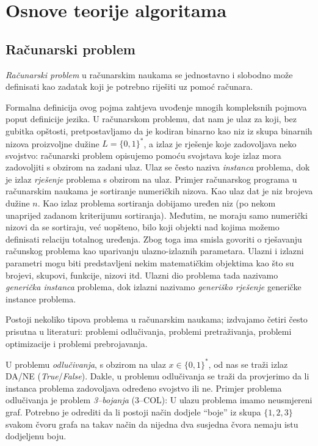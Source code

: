 \chapter{Osnove teorije algoritama}

\section{Računarski problem}

\textit{Računarski problem} u računarskim naukama se jednostavno i slobodno može definisati kao zadatak koji je potrebno riješiti uz pomoć računara. 

Formalna definicija ovog pojma zahtjeva uvođenje mnogih kompleksnih pojmova poput definicije jezika.  U računarskom problemu, dat nam je ulaz za koji, bez gubitka opštosti, pretpostavljamo da je kodiran  binarno kao niz iz skupa binarnih nizova proizvoljne dužine $L=\{0, 1\}^*$, a  izlaz je 
rješenje koje zadovoljava neko svojstvo: računarski problem    opisujemo  pomoću svojstava koje izlaz mora zadovoljiti s obzirom na zadani ulaz. Ulaz se često naziva \textit{instanca} problema, dok je izlaz \textit{rješenje} problema s obzirom na ulaz. Primjer računarskog programa u računarskim naukama je sortiranje numeričkih nizova. Kao ulaz dat je niz brojeva dužine $n$. Kao izlaz problema sortiranja dobijamo uređen niz (po nekom unaprijed zadanom kriterijumu sortiranja). Međutim, ne moraju samo numerički nizovi da se sortiraju, već uopšteno, bilo koji objekti nad kojima možemo definisati relaciju totalnog uređenja. Zbog toga ima smisla govoriti o rješavanju računskog problema kao 
 uparivanju ulazno-izlaznih parametara. Ulazni i izlazni parametri mogu biti predstavljeni nekim matematičkim objektima kao što su brojevi, skupovi, funkcije, nizovi itd. Ulazni dio problema tada nazivamo \textit{generička instanca} problema, dok izlazni nazivamo  \textit{generiško rješenje} generičke instance problema. 
 
 Postoji nekoliko tipova problema u računarskim naukama; izdvajamo četiri često prisutna u literaturi: problemi odlučivanja, problemi pretraživanja, problemi optimizacije i problemi prebrojavanja. 
 
 U problemu \textit{odlučivanja}, s obzirom na ulaz $x \in \{0, 1\}^*$, od nas se traži izlaz DA/NE (\emph{True}/\emph{False}). Dakle, u problemu odlučivanja se traži da provjerimo da li instanca problema zadovoljava određeno svojstvo ili ne. Primjer problema odlučivanja je problem \textit{3--bojanja} (3--COL):
 U ulazu problema imamo neusmjereni graf. Potrebno je odrediti da li postoji način dodjele   ``boje''  iz skupa $\{1, 2, 3\}$ svakom čvoru grafa na takav način da nijedna dva susjedna čvora nemaju istu dodjeljenu boju.
 
